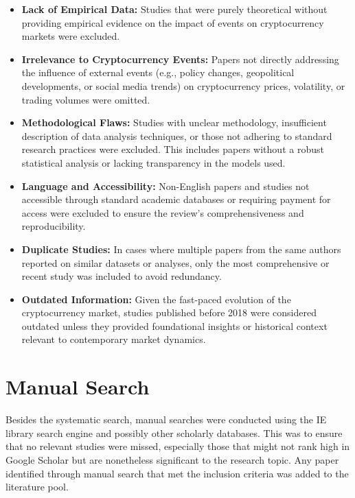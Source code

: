 \documentclass{article}
\begin{document}
\begin{itemize}
\item \textbf{Lack of Empirical Data:} Studies that were purely theoretical without providing empirical evidence on the impact of events on cryptocurrency markets were excluded.
\item \textbf{Irrelevance to Cryptocurrency Events:} Papers not directly addressing the influence of external events (e.g., policy changes, geopolitical developments, or social media trends) on cryptocurrency prices, volatility, or trading volumes were omitted.
\item \textbf{Methodological Flaws:} Studies with unclear methodology, insufficient description of data analysis techniques, or those not adhering to standard research practices were excluded. This includes papers without a robust statistical analysis or lacking transparency in the models used.
\item \textbf{Language and Accessibility:} Non-English papers and studies not accessible through standard academic databases or requiring payment for access were excluded to ensure the review's comprehensiveness and reproducibility.
\item \textbf{Duplicate Studies:} In cases where multiple papers from the same authors reported on similar datasets or analyses, only the most comprehensive or recent study was included to avoid redundancy.
\item \textbf{Outdated Information:} Given the fast-paced evolution of the cryptocurrency market, studies published before 2018 were considered outdated unless they provided foundational insights or historical context relevant to contemporary market dynamics.
\end{itemize}


\section{Manual Search}

Besides the systematic search, manual searches were conducted using the IE library search engine and possibly other scholarly databases. This was to ensure that no relevant studies were missed, especially those that might not rank high in Google Scholar but are nonetheless significant to the research topic. Any paper identified through manual search that met the inclusion criteria was added to the literature pool.
\end{document}
